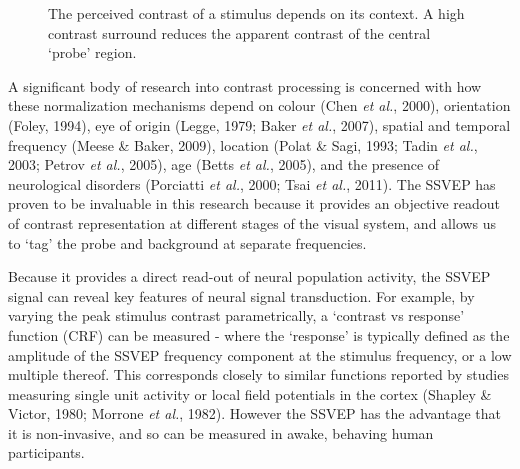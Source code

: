 \documentclass[
  letterpaper,
  DIV=11,
  numbers=noendperiod]{scrartcl}
\begin{document}
\begin{figure}


\caption{\label{fig-centresurround}The perceived contrast of a stimulus
depends on its context. A high contrast surround reduces the apparent
contrast of the central `probe' region.}

\end{figure}%

A significant body of research into contrast processing is concerned
with how these normalization mechanisms depend on colour (Chen \emph{et
al.}, 2000), orientation (Foley, 1994), eye of origin (Legge, 1979;
Baker \emph{et al.}, 2007), spatial and temporal frequency (Meese \&
Baker, 2009), location (Polat \& Sagi, 1993; Tadin \emph{et al.}, 2003;
Petrov \emph{et al.}, 2005), age (Betts \emph{et al.}, 2005), and the
presence of neurological disorders (Porciatti \emph{et al.}, 2000; Tsai
\emph{et al.}, 2011). The SSVEP has proven to be invaluable in this
research because it provides an objective readout of contrast
representation at different stages of the visual system, and allows us
to `tag' the probe and background at separate frequencies.

Because it provides a direct read-out of neural population activity, the
SSVEP signal can reveal key features of neural signal transduction. For
example, by varying the peak stimulus contrast parametrically, a
`contrast vs response' function (CRF) can be measured - where the
`response' is typically defined as the amplitude of the SSVEP frequency
component at the stimulus frequency, or a low multiple thereof. This
corresponds closely to similar functions reported by studies measuring
single unit activity or local field potentials in the cortex (Shapley \&
Victor, 1980; Morrone \emph{et al.}, 1982). However the SSVEP has the
advantage that it is non-invasive, and so can be measured in awake,
behaving human participants.
\end{document}
